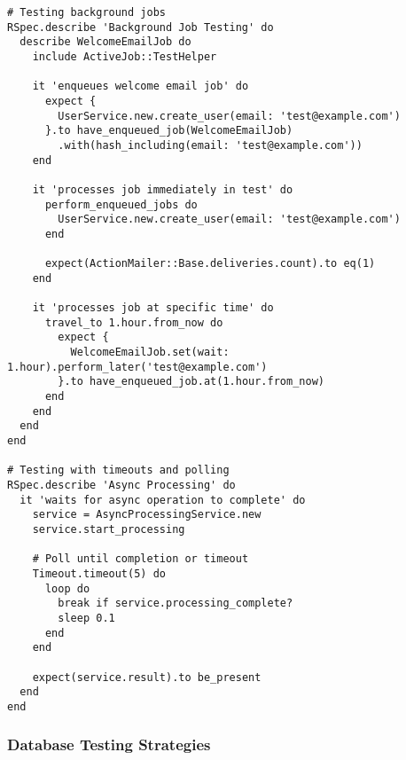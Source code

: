 \documentclass[12pt,a4paper]{article}
\begin{document}
\begin{lstlisting}
# Testing background jobs
RSpec.describe 'Background Job Testing' do
  describe WelcomeEmailJob do
    include ActiveJob::TestHelper

    it 'enqueues welcome email job' do
      expect {
        UserService.new.create_user(email: 'test@example.com')
      }.to have_enqueued_job(WelcomeEmailJob)
        .with(hash_including(email: 'test@example.com'))
    end

    it 'processes job immediately in test' do
      perform_enqueued_jobs do
        UserService.new.create_user(email: 'test@example.com')
      end
      
      expect(ActionMailer::Base.deliveries.count).to eq(1)
    end

    it 'processes job at specific time' do
      travel_to 1.hour.from_now do
        expect {
          WelcomeEmailJob.set(wait: 1.hour).perform_later('test@example.com')
        }.to have_enqueued_job.at(1.hour.from_now)
      end
    end
  end
end

# Testing with timeouts and polling
RSpec.describe 'Async Processing' do
  it 'waits for async operation to complete' do
    service = AsyncProcessingService.new
    service.start_processing
    
    # Poll until completion or timeout
    Timeout.timeout(5) do
      loop do
        break if service.processing_complete?
        sleep 0.1
      end
    end
    
    expect(service.result).to be_present
  end
end
\end{lstlisting}

\subsubsection{Database Testing Strategies}
\end{document}
